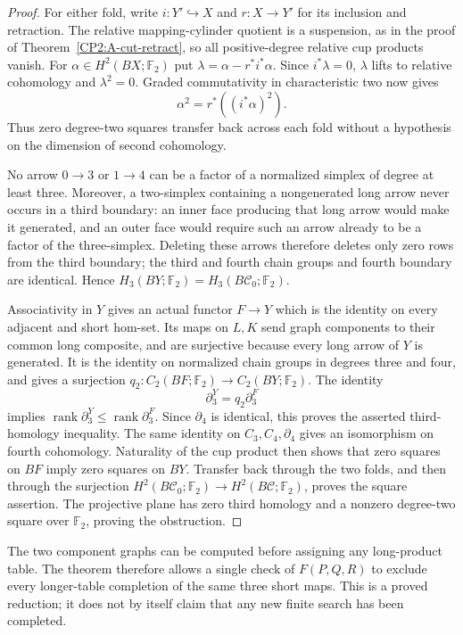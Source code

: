\begin{proof}
For either fold, write $i:Y'\hookrightarrow X$ and $r:X\to Y'$
for its inclusion and retraction. The relative mapping-cylinder
quotient is a suspension, as in the proof of
Theorem~\ref{CP2:A-cut-retract}, so all positive-degree relative
cup products vanish. For $\alpha\in H^2(BX;\mathbb F_2)$ put
$\lambda=\alpha-r^*i^*\alpha$. Since $i^*\lambda=0$,
$\lambda$ lifts to relative cohomology and $\lambda^2=0$.
Graded commutativity in characteristic two now gives
\[
 \alpha^2=r^*((i^*\alpha)^2).
\]
Thus zero degree-two squares transfer back across each fold
without a hypothesis on the dimension of second cohomology.

No arrow $0\to3$ or $1\to4$ can be a factor of a normalized
simplex of degree at least three. Moreover, a two-simplex
containing a nongenerated long arrow never occurs in a third
boundary: an inner face producing that long arrow would make
it generated, and an outer face would require such an arrow
already to be a factor of the three-simplex. Deleting these
arrows therefore deletes only zero rows from the third boundary;
the third and fourth chain groups and fourth boundary are
identical. Hence $H_3(BY;\mathbb F_2)=H_3(B\mathcal C_0;\mathbb F_2)$.

Associativity in $Y$ gives an actual functor $F\to Y$ which is
the identity on every adjacent and short hom-set. Its maps on
$L,K$ send graph components to their common long composite,
and are surjective because every long arrow of $Y$ is generated.
It is the identity on normalized chain groups in degrees three
and four, and gives a surjection $q_2:C_2(BF;\mathbb F_2)
\to C_2(BY;\mathbb F_2)$. The identity
\[
 \partial_3^Y=q_2\partial_3^F
\]
implies $\operatorname{rank}\partial_3^Y\leq
\operatorname{rank}\partial_3^F$. Since $\partial_4$ is identical,
this proves the asserted third-homology inequality.
The same identity on $C_3,C_4,\partial_4$ gives an isomorphism
on fourth cohomology. Naturality of the cup product then shows
that zero squares on $BF$ imply zero squares on $BY$. Transfer
back through the two folds, and then through the surjection
$H^2(B\mathcal C_0;\mathbb F_2)\to
H^2(B\mathcal C;\mathbb F_2)$, proves the square assertion.
The projective plane has zero third homology and a nonzero
degree-two square over $\mathbb F_2$, proving the obstruction.
\end{proof}

\begin{remark*}
The two component graphs can be computed before assigning any
long-product table. The theorem therefore allows a single check
of $F(P,Q,R)$ to exclude every longer-table completion of the
same three short maps. This is a proved reduction; it does not
by itself claim that any new finite search has been completed.
\end{remark*}
